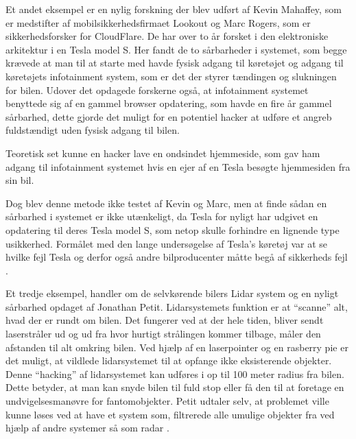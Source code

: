 Et andet eksempel er en nylig forskning der blev udført af Kevin Mahaffey, som er medstifter af mobilsikkerhedsfirmaet Lookout og Marc Rogers, som er sikkerhedsforsker for CloudFlare. De har over to år forsket i den elektroniske arkitektur i en Tesla model S. Her fandt de to sårbarheder i systemet, som begge krævede at man til at starte med havde fysisk adgang til køretøjet og adgang til køretøjets infotainment system, som er det der styrer tændingen og slukningen for bilen. Udover det opdagede forskerne også, at infotainment systemet benyttede sig af en gammel browser opdatering, som havde en fire år gammel sårbarhed, dette gjorde det muligt for en potentiel hacker at udføre et angreb fuldstændigt uden fysisk adgang til bilen.

Teoretisk set kunne en hacker lave en ondsindet hjemmeside, som gav ham adgang til infotainment systemet hvis en ejer af en Tesla besøgte hjemmesiden fra sin bil.

Dog blev denne metode ikke testet af Kevin og Marc, men at finde sådan en sårbarhed i systemet er ikke utænkeligt, da Tesla for nyligt har udgivet en opdatering til deres Tesla model S, som netop skulle forhindre en lignende type usikkerhed.  Formålet med den lange undersøgelse af Tesla's køretøj var at se hvilke fejl Tesla og derfor også andre bilproducenter måtte begå af sikkerheds fejl \cite{Tesla}.


Et tredje eksempel, handler om de selvkørende bilers Lidar system og en nyligt sårbarhed opdaget af Jonathan Petit. Lidarsystemets funktion er at ``scanne'' alt, hvad der er rundt om bilen. Det fungerer ved at der hele tiden, bliver sendt laserstråler ud og ud fra hvor hurtigt strålingen kommer tilbage, måler den afstanden til alt omkring bilen. Ved hjælp af en laserpointer og en rasberry pie er det muligt, at vildlede lidarsystemet til at opfange ikke eksisterende objekter. Denne ``hacking'' af lidarsystemet kan udføres i op til 100 meter radius fra bilen. Dette betyder, at man kan snyde bilen til fuld stop eller få den til at foretage en  undvigelsesmanøvre for fantomobjekter. Petit udtaler selv, at problemet ville kunne løses ved at have et system som, filtrerede alle umulige objekter fra ved hjælp af andre systemer så som radar \cite{Lidar}.

